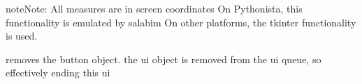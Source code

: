\documentclass[letterpaper,10pt,english]{sphinxmanual}
\begin{document}
\begin{fulllineitems}
\begin{sphinxadmonition}{note}{Note:}
All measures are in screen coordinates 
On Pythonista, this functionality is emulated by salabim
On other platforms, the tkinter functionality is used.
\end{sphinxadmonition}

\begin{fulllineitems}
\label{\detokenize{Reference:salabim.AnimateButton.remove}}
removes the button object. 
the ui object is removed from the ui queue,
so effectively ending this ui

\end{fulllineitems}


\end{fulllineitems}

\end{document}
